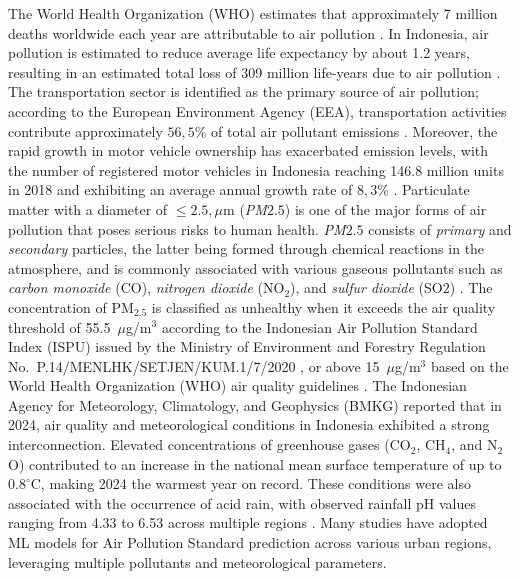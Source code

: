 \documentclass[pdflatex,sn-mathphys-num]{sn-jnl}%
\theoremstyle{thmstyleone}%
\theoremstyle{thmstyletwo}%
\theoremstyle{thmstylethree}%
\begin{document}
	The World Health Organization (WHO) estimates that approximately 7 million deaths worldwide each year are attributable to air pollution \cite{WHO2024}. In Indonesia, air pollution is estimated to reduce average life expectancy by about 1.2 years, resulting in an estimated total loss of 309 million life-years due to air pollution \cite{Madrigano2024}. The transportation sector is identified as the primary source of air pollution; according to the European Environment Agency (EEA), transportation activities contribute approximately $56{,}5\%$ of total air pollutant emissions \cite{EEA2022Transport}. Moreover, the rapid growth in motor vehicle ownership has exacerbated emission levels, with the number of registered motor vehicles in Indonesia reaching 146.8 million units in 2018 and exhibiting an average annual growth rate of $8{,}3\%$ \cite{Dimension2022}.
	Particulate matter with a diameter of $\leq 2.5,\mu\text{m}$ (\textit{PM}${2.5}$) is one of the major forms of air pollution that poses serious risks to human health. \textit{PM}${2.5}$ consists of {\itshape primary} and {\itshape secondary} particles, the latter being formed through chemical reactions in the atmosphere, and is commonly associated with various gaseous pollutants such as {\itshape carbon monoxide} (CO), {\itshape nitrogen dioxide} (NO$_2$), and {\itshape sulfur dioxide} (SO$2$) \cite{Shu2024} . The concentration of PM$_{2.5}$ is classified as unhealthy when it exceeds the air quality threshold of 55.5~$\mu$g/m$^{3}$ according to the Indonesian Air Pollution Standard Index (ISPU) issued by the Ministry of Environment and Forestry Regulation No.~P.14/MENLHK/SETJEN/KUM.1/7/2020 \cite{KLHK2020}, or above 15~$\mu$g/m$^3$ based on the World Health Organization (WHO) air quality guidelines \cite{WHO2021}.
	The Indonesian Agency for Meteorology, Climatology, and Geophysics (BMKG) reported that in 2024, air quality and meteorological conditions in Indonesia exhibited a strong interconnection. Elevated concentrations of greenhouse gases (CO$_2$, CH$_4$, and N$_2$O) contributed to an increase in the national mean surface temperature of up to $0.8^{\circ}\mathrm{C}$, making 2024 the warmest year on record. These conditions were also associated with the occurrence of acid rain, with observed rainfall pH values ranging from 4.33 to 6.53 across multiple regions \cite{BMKG2024}.
	Many studies have adopted ML models for Air Pollution Standard prediction across various urban regions, leveraging multiple pollutants and meteorological parameters.
\end{document}
